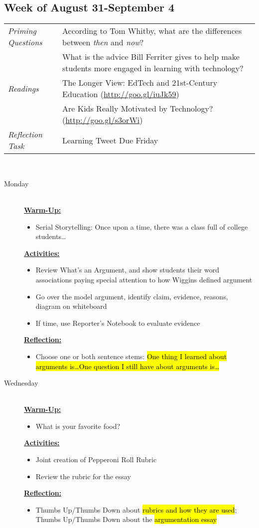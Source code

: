 \documentclass{tufte-handout}
\newcommand{\tabpq}{\faQuestionCircle\medspace\textit{Priming Questions}}
\newcommand{\tabread}{\faBook\medspace\textit{Readings}}
\newcommand{\tabtweet}{\faLightbulbO\medspace\textit{Reflection Task} & Learning Tweet Due Friday \\}
\newenvironment{tabsched}
	{\small
	\begin{tabular}{p{1.5in}p{4.5in}}
	\toprule}
	{\bottomrule
	\end{tabular}
	\normalsize\\}
\newcommand{\weekthree}{August 31-September 4}
\newcommand{\listmon}{\item[Monday] \hfill \\}
\newcommand{\listwed}{\item[Wednesday] \hfill \\}
\newenvironment{daywu}
	{\textbf{\underline{Warm-Up:}} \hfill \\
	\begin{itemize}}
	{\end{itemize}}
\newenvironment{dayact}
	{\textbf{\underline{Activities:}} \hfill \\
	\begin{itemize}}
	{\end{itemize}}
\newenvironment{dayref}
	{\textbf{\underline{Reflection:}} \hfill \\
	\begin{itemize}}
	{\end{itemize}}
\newenvironment{weeksched}
	{\noindent
	\begin{description}}
	{\end{description}
	\newpage}
\begin{document}
\begin{fullwidth}
\subsection{Week of \weekthree}

\begin{tabsched}
	\tabpq & According to Tom Whitby, what are the differences between \textit{then} and \textit{now}? \\
	& What is the advice Bill Ferriter gives to help make students more engaged in learning with technology? \\
	\midrule
	\tabread & The Longer View: EdTech and 21st-Century Education (\url{http://goo.gl/iuJk59}) \\
	& Are Kids Really Motivated by Technology? (\url{http://goo.gl/s3orWi}) \\
	\midrule
	\tabtweet
\end{tabsched}
\begin{weeksched}
\listmon
	\begin{daywu}
		\item Serial Storytelling: Once upon a time, there was a class full of college students\ldots
	\end{daywu}
	\begin{dayact}
		\item Review What's an Argument, and show students their word associations paying special attention to how Wiggins defined argument
		\item Go over the model argument, identify claim, evidence, reasons, diagram on whiteboard
		\item If time, use Reporter's Notebook to evaluate evidence
	\end{dayact}
	\begin{dayref}
		\item Choose one or both sentence stems: \hl{One thing I learned about arguments is\ldots One question I still have about arguments is\ldots{}}
	\end{dayref}

\listwed
	\begin{daywu}
		\item What is your favorite food?
	\end{daywu}
	\begin{dayact}
		\item Joint creation of Pepperoni Roll Rubric
		\item Review the rubric for the essay
	\end{dayact}
	\begin{dayref}
		\item Thumbs Up/Thumbs Down about \hl{rubrics and how they are used}; Thumbs Up/Thumbs Down about the \hl{argumentation essay}
	\end{dayref}


\end{weeksched}
\end{fullwidth}
\end{document}
